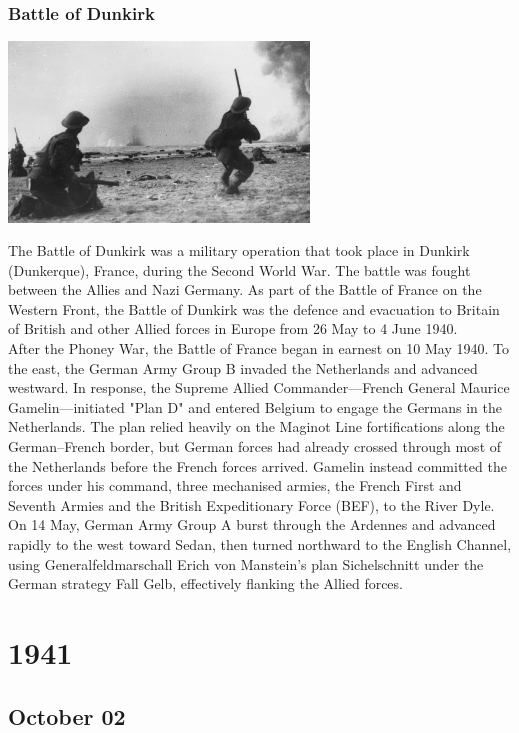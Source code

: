 \documentclass[11pt]{report}
\begin{document}
\subsection{Battle of Dunkirk}
\vspace{2mm}\begin{center}\includegraphics[width=8cm]{./img/dunkirk.jpg}\end{center}
The Battle of Dunkirk was a military operation that took place in Dunkirk (Dunkerque), France, during the Second World War. The battle was fought between the Allies and Nazi Germany. As part of the Battle of France on the Western Front, the Battle of Dunkirk was the defence and evacuation to Britain of British and other Allied forces in Europe from 26 May to 4 June 1940.\\
\indent After the Phoney War, the Battle of France began in earnest on 10 May 1940. To the east, the German Army Group B invaded the Netherlands and advanced westward. In response, the Supreme Allied Commander—French General Maurice Gamelin—initiated "Plan D" and entered Belgium to engage the Germans in the Netherlands. The plan relied heavily on the Maginot Line fortifications along the German–French border, but German forces had already crossed through most of the Netherlands before the French forces arrived. Gamelin instead committed the forces under his command, three mechanised armies, the French First and Seventh Armies and the British Expeditionary Force (BEF), to the River Dyle. On 14 May, German Army Group A burst through the Ardennes and advanced rapidly to the west toward Sedan, then turned northward to the English Channel, using Generalfeldmarschall Erich von Manstein's plan Sichelschnitt under the German strategy Fall Gelb, effectively flanking the Allied forces.

\chapter{1941}
\section{October 02}
\end{document}
